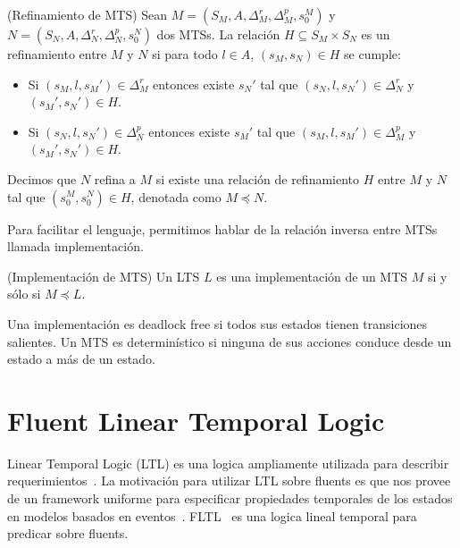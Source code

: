 \begin{definition}{(Refinamiento de MTS)}
Sean $M = (S_{M}, A, \Delta_{M}^{r}, \Delta_{M}^{p}, s_{0}^{M})$ y\\
$N = (S_{N}, A, \Delta_{N}^{r}, \Delta_{N}^{p}, s_{0}^{N})$ dos MTSs. La relación $H \subseteq S_{M} \times S_{N}$ es un refinamiento 
entre $M$ y $N$ si para todo $l \in A$, $(s_{M}, s_{N}) \in H$ se cumple:

\begin{itemize}
\item
Si $(s_{M}, l, s_{M}') \in \Delta_{M}^{r}$ entonces existe $s_{N}'$ tal que $(s_{N}, l, s_{N}') \in \Delta_{N}^{r}$ y $(s_{M}', s_{N}') \in H$.
\item
Si $(s_{N}, l, s_{N}') \in \Delta_{N}^{p}$ entonces existe $s_{M}'$ tal que $(s_{M}, l, s_{M}') \in \Delta_{M}^{p}$ y $(s_{M}', s_{N}') \in H$.
\end{itemize}

Decimos que $N$ refina a $M$ si existe una relación de refinamiento $H$ entre $M$ y $N$ tal que $(s_{0}^{M}, s_{0}^{N}) \in H$, denotada como $M \preceq N$.

\end{definition}

Para facilitar el lenguaje, permitimos hablar de la relación inversa entre MTSs 
llamada implementación.

\begin{definition}{(Implementación de MTS)}
Un LTS $L$ es una implementación de un MTS $M$ si y sólo si $M \preceq L$.
\end{definition}

Una implementación es deadlock free si todos sus estados tienen transiciones salientes. 
Un MTS es determinístico si ninguna de sus acciones conduce desde un estado a más de un estado.

\section{Fluent Linear Temporal Logic}

Linear Temporal Logic (LTL) es una logica ampliamente utilizada para describir 
requerimientos~\cite{vanLamsweerde:2000:HOG:357525.357521}. La motivación para 
utilizar LTL sobre fluents es que 
nos provee de un framework uniforme para especificar propiedades temporales de 
los estados en modelos basados en 
eventos~\cite{vanLamsweerde:2000:HOG:357525.357521}.
FLTL~\cite{FLTL} es una logica lineal temporal para predicar sobre fluents.

